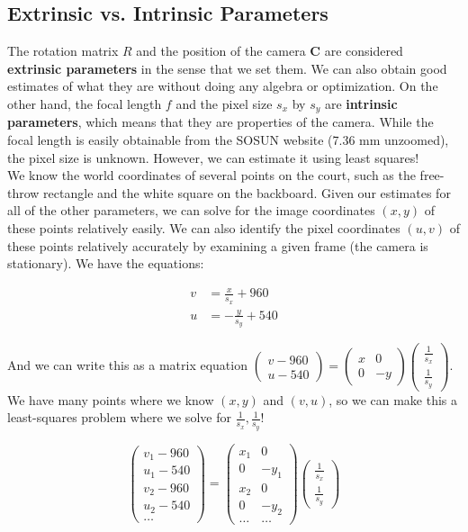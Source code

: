 \documentclass{article}
\begin{document}
\subsection{Extrinsic vs. Intrinsic Parameters}
The rotation matrix $R$ and the position of the camera $\bm{C}$ are considered \textbf{extrinsic parameters} in the sense that we set them. 
We can also obtain good estimates of what they are without doing any algebra or optimization. 
On the other hand, the focal length $f$ and the pixel size $s_{x}$ by $s_{y}$ are \textbf{intrinsic parameters}, which means that they are properties of the camera. 
While the focal length is easily obtainable from the SOSUN website (7.36 mm unzoomed), the pixel size is unknown. However, we can estimate it using least squares! \\

We know the world coordinates of several points on the court, such as the free-throw rectangle and the white square on the backboard. 
Given our estimates for all of the other parameters, we can solve for the image coordinates $(x, y)$ of these points relatively easily. 
We can also identify the pixel coordinates $(u, v)$ of these points relatively accurately by examining a given frame (the camera is stationary). 
We have the equations:

\begin{align*}
v&=\frac{x}{s_{x}}+960 \\
u&=-\frac{y}{s_{y}}+540
\end{align*}

And we can write this as a matrix equation 
$\begin{pmatrix} v-960 \\ u-540 \end{pmatrix}=\begin{pmatrix} x & 0 \\ 0 & -y \end{pmatrix}\begin{pmatrix} \frac{1}{s_x} \\ \frac{1}{s_y} \end{pmatrix}$. 
We have many points where we know $(x, y)$ and $(v, u)$, so we can make this a least-squares problem where we solve for $\frac{1}{s_x}, \frac{1}{s_y}$!

\[\begin{pmatrix} v_1-960 \\ u_1-540 \\ v_2-960 \\ u_2-540 \\ \hdots \end{pmatrix}=
\begin{pmatrix} x_1 & 0 \\ 0 & -y_1 \\ x_2 & 0 \\ 0 & -y_2 \\ \hdots & \hdots \end{pmatrix}
\begin{pmatrix} \frac{1}{s_x} \\ \frac{1}{s_y} \end{pmatrix}\]
\end{document}
